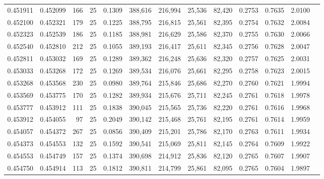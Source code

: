 \begin{tabular}{rrrrrrrrrrrrr}
0.451911 & 0.452099 &   166 &  25 &                                     0.1309 & 388,616 & 216,994 &  25,536 &  82,420 & 0.2753 & 0.7635 & 2.0100 \\
0.452100 & 0.452321 &   179 &  25 &                                     0.1225 & 388,795 & 216,815 &  25,561 &  82,395 & 0.2754 & 0.7632 & 2.0084 \\
0.452323 & 0.452539 &   186 &  25 &                                     0.1185 & 388,981 & 216,629 &  25,586 &  82,370 & 0.2755 & 0.7630 & 2.0066 \\
0.452540 & 0.452810 &   212 &  25 &                                     0.1055 & 389,193 & 216,417 &  25,611 &  82,345 & 0.2756 & 0.7628 & 2.0047 \\
0.452811 & 0.453032 &   169 &  25 &                                     0.1289 & 389,362 & 216,248 &  25,636 &  82,320 & 0.2757 & 0.7625 & 2.0031 \\
0.453033 & 0.453268 &   172 &  25 &                                     0.1269 & 389,534 & 216,076 &  25,661 &  82,295 & 0.2758 & 0.7623 & 2.0015 \\
0.453268 & 0.453568 &   230 &  25 &                                     0.0980 & 389,764 & 215,846 &  25,686 &  82,270 & 0.2760 & 0.7621 & 1.9994 \\
0.453569 & 0.453775 &   170 &  25 &                                     0.1282 & 389,934 & 215,676 &  25,711 &  82,245 & 0.2761 & 0.7618 & 1.9978 \\
0.453777 & 0.453912 &   111 &  25 &                                     0.1838 & 390,045 & 215,565 &  25,736 &  82,220 & 0.2761 & 0.7616 & 1.9968 \\
0.453912 & 0.454055 &    97 &  25 &                                     0.2049 & 390,142 & 215,468 &  25,761 &  82,195 & 0.2761 & 0.7614 & 1.9959 \\
0.454057 & 0.454372 &   267 &  25 &                                     0.0856 & 390,409 & 215,201 &  25,786 &  82,170 & 0.2763 & 0.7611 & 1.9934 \\
0.454373 & 0.454553 &   132 &  25 &                                     0.1592 & 390,541 & 215,069 &  25,811 &  82,145 & 0.2764 & 0.7609 & 1.9922 \\
0.454553 & 0.454749 &   157 &  25 &                                     0.1374 & 390,698 & 214,912 &  25,836 &  82,120 & 0.2765 & 0.7607 & 1.9907 \\
0.454750 & 0.454914 &   113 &  25 &                                     0.1812 & 390,811 & 214,799 &  25,861 &  82,095 & 0.2765 & 0.7604 & 1.9897 \\

\end{tabular}
